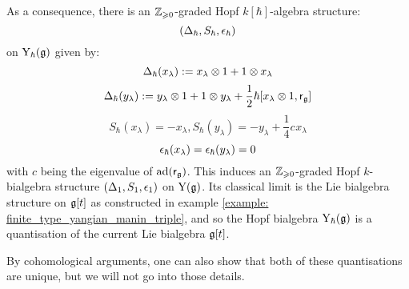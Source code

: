 \begin{example}
            As a consequence, there is an $\mathbb{Z}_{\geqslant 0}$-graded Hopf $k[\hbar]$-algebra structure:
                $$(\Delta_{\hbar}, S_{\hbar}, \epsilon_{\hbar})$$
            on $\mathrm{Y}_{\hbar}(\mathfrak{g})$ given by:
                $$\Delta_{\hbar}(x_{\lambda}) := x_{\lambda} \tensor 1 + 1 \tensor x_{\lambda}$$
                $$\Delta_{\hbar}(y_{\lambda}) := y_{\lambda} \tensor 1 + 1 \tensor y_{\lambda} + \frac12 \hbar [x_{\lambda} \tensor 1, \sfr_{\g}]$$
                $$S_{\hbar}(x_{\lambda}) = -x_{\lambda}, S_{\hbar}(y_{\lambda}) = -y_{\lambda} + \frac14 c_{} x_{\lambda}$$
                $$\epsilon_{\hbar}(x_{\lambda}) = \epsilon_{\hbar}(y_{\lambda}) = 0$$
            with $c$ being the eigenvalue of $\mathrm{ad}(\mathsf{r}_{\mathfrak{g}})$. This induces an $\mathbb{Z}_{\geqslant 0}$-graded Hopf $k$-bialgebra structure $(\Delta_1, S_1, \epsilon_1)$ on $\mathrm{Y}(\mathfrak{g})$. Its classical limit is the Lie bialgebra structure on $\mathfrak{g}[t]$ as constructed in example \ref{example: finite_type_yangian_manin_triple}, and so the Hopf bialgebra $\mathrm{Y}_{\hbar}(\mathfrak{g})$ is a quantisation of the current Lie bialgebra $\mathfrak{g}[t]$. 
        \end{example}
        By cohomological arguments, one can also show that both of these quantisations are unique, but we will not go into those details.


